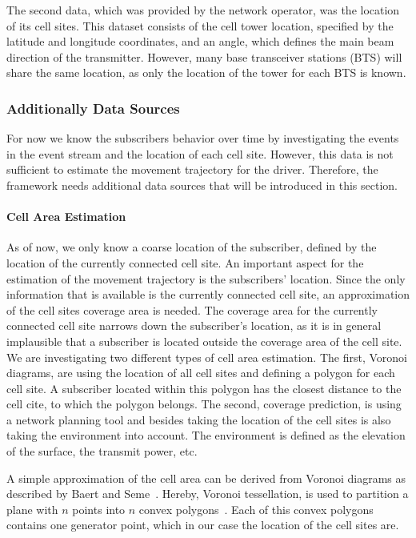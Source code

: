 The second data, which was provided by the network operator, was the location of its cell sites. This dataset consists of the cell tower location, specified by the latitude and longitude coordinates, and an angle, which defines the main beam direction of the transmitter. However, many base transceiver stations (BTS) will share the same location, as only the location of the tower for each BTS is known.

\subsubsection{Additionally Data Sources}
For now we know the subscribers behavior over time by investigating the events in the event stream and the location of each cell site. However, this data is not sufficient to estimate the movement trajectory for the driver. Therefore, the framework needs additional data sources that will be introduced in this section.

\paragraph{Cell Area Estimation}
As of now, we only know a coarse location of the subscriber, defined by the location of the currently connected cell site. An important aspect for the estimation of the movement trajectory is the subscribers' location. Since the only information that is available is the currently connected cell site, an approximation of the cell sites coverage area is needed. The coverage area for the currently connected cell site narrows down the subscriber's location, as it is in general implausible that a subscriber is located outside the coverage area of the cell site. We are investigating two different types of cell area estimation. The first, Voronoi diagrams, are using the location of all cell sites and defining a polygon for each cell site. A subscriber located within this polygon has the closest distance to the cell cite, to which the polygon belongs. The second, coverage prediction, is using a network planning tool and besides taking the location of the cell sites is also taking the environment into account. The environment is defined as the elevation of the surface, the transmit power, etc. \newline


A simple approximation of the cell area can be derived from Voronoi diagrams as described by Baert and Seme~\cite{Baert2004}. Hereby, Voronoi tessellation, is used to partition a plane with $n$ points into $n$ convex polygons~\cite{Aurenhammer1991}. Each of this convex polygons contains one generator point, which in our case the location of the cell sites are. %

